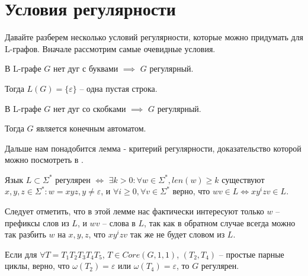 \section{Условия регулярности}

Давайте разберем несколько условий регулярности, которые можно придумать для L-графов.
Вначале рассмотрим самые очевидные условия.

\begin{theorem}
    \label{condition_no_letters}
    В L-графе $G$ нет дуг с буквами $\implies$ $G$ регулярный. 
\end{theorem}
Тогда $L(G) = \{ \varepsilon \}$ -- одна пустая строка.


\begin{theorem}
    \label{condition_no_brackets}
    В L-графе $G$ нет дуг со скобками $\implies$ $G$ регулярный.
\end{theorem}
Тогда $G$ является конечным автоматом.

Дальше нам понадобится лемма - критерий регулярности, доказательство которой можно посмотреть в \cite{handbook_of_formal}.

\begin{lemma}
    \label{pumping_lemma_4_3}
    Язык $L \subset \Sigma^*$ регулярен $\iff$ $\exists k > 0: \forall w \in \Sigma^*, len(w) \geq k$ 
    существуют $x,y,z \in \Sigma^*: w=xyz, y \neq \varepsilon$,
    и $\forall i \geq 0, \forall v \in \Sigma^*$ верно, что $wv \in L \iff xy^izv \in L$. 
\end{lemma}

Следует отметить, что в этой лемме нас фактически интересуют только $w$ -- префиксы слов из $L$, и $wv$ -- слова в $L$, 
так как в обратном случае всегда можно так разбить $w$ на $x,y,z$, что $xy^izv$ так же не будет словом из $L$.  

\begin{theorem}
    \label{condition_one_sided_loops}
    Если для $\forall T = T_1 T_2 T_3 T_4 T_5$, $T \in Core(G, 1, 1)$, $(T_2, T_4)$ -- простые парные циклы, 
    верно, что $\omega(T_2) = \varepsilon$ или $\omega(T_4) = \varepsilon$,
    то $G$ регулярен.
\end{theorem}

